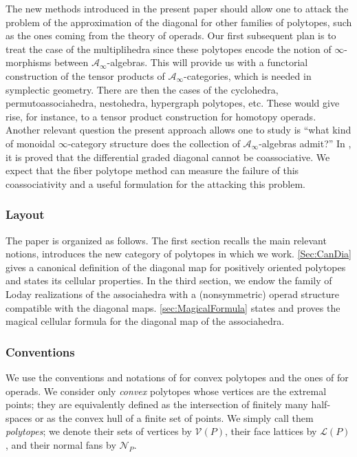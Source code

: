 \documentclass[JEP,XML,SOM,Unicode,NoFloatCountersInSection]{cedram}
\let\mathcal\mathscr
\theoremstyle{plain}
\theoremstyle{definition}
\newcommand{\La}{\mathcal{L}}
\renewcommand{\No}{\mathcal{N}}
\newcommand{\Ve}{\mathcal{V}}
\begin{document}
The new methods introduced in the present paper should allow one to attack the problem of the approximation of the diagonal for other families of polytopes, such as the ones coming from the theory of operads.
Our first subsequent plan
is to treat the case of the multiplihedra \cite{Stasheff70} since these polytopes encode the notion of $\infty$-morphisms between $\mathcal{A}_\infty$-algebras. This will provide us with a functorial construction of the tensor products of $\mathcal{A}_\infty$-categories, which is needed in symplectic geometry.
There are then the cases of the cyclohedra, permutoassociahedra, nestohedra, hypergraph polytopes, etc. These would give rise, for instance, to a tensor product construction for homotopy operads. Another relevant question the present approach allows one to study is ``what kind of monoidal $\infty$-category structure does the collection of $\mathcal{A}_\infty$-algebras admit?''
In \cite{MarklShnider06}, it is proved that the differential graded diagonal cannot be coassociative. We expect that the fiber polytope method can measure the failure of this coassociativity and a useful formulation for the attacking this problem.

\subsubsection*{Layout}
The paper is organized as follows. The first section recalls the main relevant notions, introduces the new category of polytopes in which we work. \cref{Sec:CanDia} gives a canonical definition of the diagonal map for positively oriented polytopes and states its cellular properties. In the third section, we endow the family of Loday realizations of the associahedra with a (nonsymmetric) operad structure compatible with the diagonal maps. \cref{sec:MagicalFormula} states and proves the magical cellular formula for the diagonal map of the associahedra.

\subsubsection*{Conventions} We use the conventions and notations of \cite{Ziegler95} for convex polytopes and the ones of \cite{LodayVallette12} for operads. We consider only \emph{convex} polytopes whose vertices are the extremal points; they are equivalently defined as the intersection of finitely many half-spaces or as the convex hull of a finite set of points. We simply call them \emph{polytopes}; we denote their sets of vertices by $\Ve(P)$, their face lattices by $\La(P)$, and their normal fans by $\No_P$.
\end{document}
